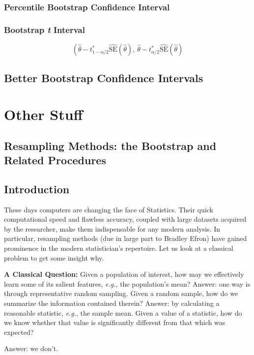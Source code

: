 \documentclass[captions=tableheading]{scrbook}
\begin{document}
\subsection{Percentile Bootstrap Confidence Interval}
\label{sec-4_5_3}
\subsection{Bootstrap \emph{t} Interval}
\label{sec-4_5_4}

\[
\left( \hat{\theta} - t_{1 - \alpha/2}^{\ast}\widehat{\mathrm{SE}}(\hat{\theta}),\  \hat{\theta} - t_{\alpha/2}^{\ast}\widehat{\mathrm{SE}}(\hat{\theta})
\]
\section{Better Bootstrap Confidence Intervals}
\label{sec-4_6}
\chapter{Other Stuff}
\label{sec-5}
\section{Resampling Methods: the Bootstrap and Related Procedures}
\label{sec-5_1}
\section{Introduction}
\label{sec-5_2}


These days computers are changing the face of Statistics. Their quick computational speed and flawless accuracy, coupled with large datasets acquired by the researcher, make them indispensable for any modern analysis. In particular, resampling methods (due in large part to Bradley Efron) have gained prominence in the modern statistician's repertoire. Let us look at a classical problem to get some insight
why.

\textbf{A Classical Question:} Given a population of interest, how may we effectively learn some of its salient features, \emph{e.g.}, the population's mean? Answer: one way is through representative random sampling. Given a random sample, how do we summarize the information contained therein? Answer: by calculating a reasonable statistic, \emph{e.g.}, the sample mean. Given a value of a statistic, how do we know whether that value is significantly different from that which was expected?

\begin{center}
Answer: we don't. 
\end{center}
\end{document}
